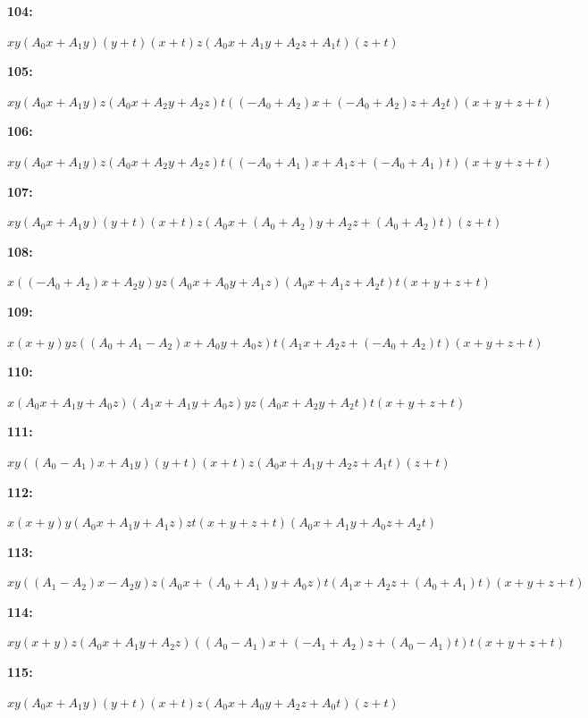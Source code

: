 \documentclass[12pt]{amsart}
\theoremstyle{plain}
\theoremstyle{remark}
\theoremstyle{definition}
\numberwithin{table}{section}
\begin{document}
\noindent\parbox[right]{9mm}{\textbf{104:}}\parbox{3mm}{\hfill}%
\parbox[t]{15cm}{\(xy(A_{0}x + A_{1}y)(y + t)(x + t)z(A_{0}x + A_{1}y + A_{2}z + A_{1}t)(z + t)\)}

\noindent\parbox[right]{9mm}{\textbf{105:}}\parbox{3mm}{\hfill}%
\parbox[t]{15cm}{\(xy(A_{0}x + A_{1}y)z(A_{0}x + A_{2}y + A_{2}z)t((-A_{0} + A_{2})x + (-A_{0} + A_{2})z + A_{2}t)(x + y + z + t)\)}

\noindent\parbox[right]{9mm}{\textbf{106:}}\parbox{3mm}{\hfill}%
\parbox[t]{15cm}{\(xy(A_{0}x + A_{1}y)z(A_{0}x + A_{2}y + A_{2}z)t((-A_{0} + A_{1})x + A_{1}z + (-A_{0} + A_{1})t)(x + y + z + t)\)}

\noindent\parbox[right]{9mm}{\textbf{107:}}\parbox{3mm}{\hfill}%
\parbox[t]{15cm}{\(xy(A_{0}x + A_{1}y)(y + t)(x + t)z(A_{0}x + (A_{0} + A_{2})y + A_{2}z + (A_{0} + A_{2})t)(z + t)\)}

\noindent\parbox[right]{9mm}{\textbf{108:}}\parbox{3mm}{\hfill}%
\parbox[t]{15cm}{\(x((-A_{0} + A_{2})x + A_{2}y)yz(A_{0}x + A_{0}y + A_{1}z)(A_{0}x + A_{1}z + A_{2}t)t(x + y + z + t)\)}

\noindent\parbox[right]{9mm}{\textbf{109:}}\parbox{3mm}{\hfill}%
\parbox[t]{15cm}{\(x(x + y)yz((A_{0} + A_{1} - A_{2})x + A_{0}y + A_{0}z)t(A_{1}x + A_{2}z + (-A_{0} + A_{2})t)(x + y + z + t)\)}

\noindent\parbox[right]{9mm}{\textbf{110:}}\parbox{3mm}{\hfill}%
\parbox[t]{15cm}{\(x(A_{0}x + A_{1}y + A_{0}z)(A_{1}x + A_{1}y + A_{0}z)yz(A_{0}x + A_{2}y + A_{2}t)t(x + y + z + t)\)}

\noindent\parbox[right]{9mm}{\textbf{111:}}\parbox{3mm}{\hfill}%
\parbox[t]{15cm}{\(xy((A_{0} - A_{1})x + A_{1}y)(y + t)(x + t)z(A_{0}x + A_{1}y + A_{2}z + A_{1}t)(z + t)\)}

\noindent\parbox[right]{9mm}{\textbf{112:}}\parbox{3mm}{\hfill}%
\parbox[t]{15cm}{\(x(x + y)y(A_{0}x + A_{1}y + A_{1}z)zt(x + y + z + t)(A_{0}x + A_{1}y + A_{0}z + A_{2}t)\)}

\noindent\parbox[right]{9mm}{\textbf{113:}}\parbox{3mm}{\hfill}%
\parbox[t]{15cm}{\(xy((A_{1} - A_{2})x - A_{2}y)z(A_{0}x + (A_{0} + A_{1})y + A_{0}z)t(A_{1}x + A_{2}z + (A_{0} + A_{1})t)(x + y + z + t)\)}

\noindent\parbox[right]{9mm}{\textbf{114:}}\parbox{3mm}{\hfill}%
\parbox[t]{15cm}{\(xy(x + y)z(A_{0}x + A_{1}y + A_{2}z)((A_{0} - A_{1})x + (-A_{1} + A_{2})z + (A_{0} - A_{1})t)t(x + y + z + t)\)}

\noindent\parbox[right]{9mm}{\textbf{115:}}\parbox{3mm}{\hfill}%
\parbox[t]{15cm}{\(xy(A_{0}x + A_{1}y)(y + t)(x + t)z(A_{0}x + A_{0}y + A_{2}z + A_{0}t)(z + t)\)}
\end{document}
